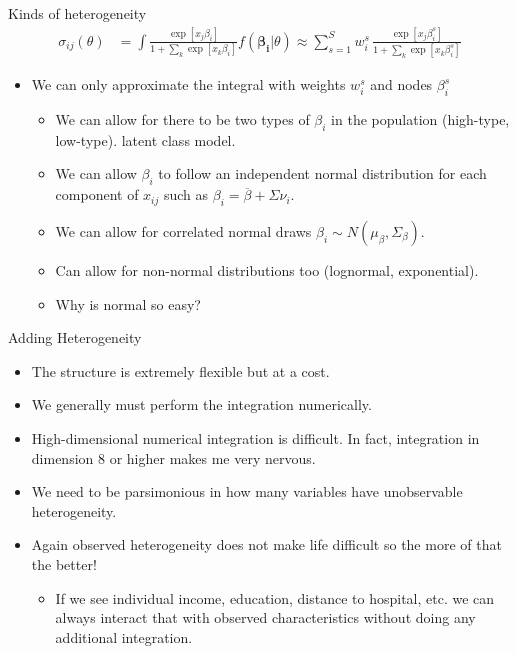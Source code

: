 \documentclass[aspectratio=169,11pt]{beamer}
\begin{document}
\begin{frame}{Kinds of heterogeneity}
\begin{align*}
\sigma_{ij}(\theta) &= \int \frac{\exp[x_{j} \beta_i ]}{1+\sum_k \exp[x_{k} \beta_i ]} f(\symbf{\beta_i} | \theta) \approx \sum_{s=1}^S w_i^s \, \frac{\exp[x_{j} \beta_i^s ]}{1+\sum_k \exp[x_{k} \beta_i^s ]}
\end{align*}

\begin{itemize}
\item We can only \alert{approximate} the integral with \alert{weights} $w_{i}^s$ and \alert{nodes} $\beta_i^s$
\begin{itemize}
\item We can allow for there to be two types of $\beta_i$ in the population (high-type, low-type). \alert{latent class model}.
\item We can allow $\beta_i$ to follow an independent normal distribution for each component of $x_{ij}$ such as $\beta_i = \overline{\beta} + \Sigma \nu_i$.
\item We can allow for correlated normal draws $\beta_i \sim N(\mu_{\beta},\Sigma_{\beta})$.
\item Can allow for non-normal distributions too (lognormal, exponential).
\item Why is normal so easy?
\end{itemize}
\end{itemize}
\end{frame}

\begin{frame}{Adding Heterogeneity}
\begin{itemize}
\item The structure is extremely flexible but at a cost.
\item We generally must perform the integration numerically.
\item High-dimensional numerical integration is difficult. In fact, integration in dimension 8 or higher makes me very nervous.
\item We need to be parsimonious in how many variables have unobservable heterogeneity.
\item Again observed heterogeneity does not make life difficult so the more of that the better!
\begin{itemize}
\item If we see individual income, education, distance to hospital, etc. we can always interact that with observed characteristics without doing any additional integration.
\end{itemize}
\end{itemize}
\end{frame}
\end{document}
